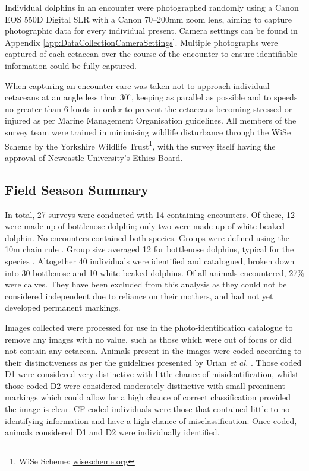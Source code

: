 Individual dolphins in an encounter were photographed randomly using a Canon EOS 550D Digital SLR with a Canon 70–200mm zoom lens, aiming to capture photographic data for every individual present. Camera settings can be found in Appendix \ref{app:DataCollectionCameraSettings}. Multiple photographs were captured of each cetacean over the course of the encounter to ensure identifiable information could be fully captured. 

When capturing an encounter care was taken not to approach individual cetaceans at an angle less than $30^{\circ}$, keeping as parallel as possible and to speeds no greater than 6 knots in order to prevent the cetaceans becoming stressed or injured as per Marine Management Organisation guidelines. All members of the survey team were trained in minimising wildlife disturbance through the WiSe Scheme by the Yorkshire Wildlife Trust\footnote{WiSe Scheme: \href{https://www.wisescheme.org/}{wisescheme.org}}, with the survey itself having the approval of Newcastle University's Ethics Board.

\subsection{Field Season Summary}\label{ch:NDD,sec:dataCollection,sub:summary}

In total, 27 surveys were conducted with 14 containing encounters. Of these, 12 were made up of bottlenose dolphin; only two were made up of white-beaked dolphin. No encounters contained both species. Groups were defined using the 10m chain rule \cite{smolker_sex_1992}. Group size averaged 12 for bottlenose dolphins, typical for the species \cite{shane_ecology_1986}. Altogether 40 individuals were identified and catalogued, broken down into 30 bottlenose and 10 white-beaked dolphins. Of all animals encountered, 27\% were calves. They have been excluded from this analysis as they could not be considered independent due to reliance on their mothers, and had not yet developed permanent markings.

Images collected were processed for use in the photo-identification catalogue to remove any images with no value, such as those which were out of focus or did not contain any cetacean. Animals present in the images were coded according to their distinctiveness as per the guidelines presented by Urian \textit{et al.} \cite{urian_recommendations_2015}. Those coded D1 were considered very distinctive with little chance of misidentification, whilst those coded D2 were considered moderately distinctive with small prominent markings which could allow for a high chance of correct classification provided the image is clear. CF coded individuals were those that contained little to no identifying information and have a high chance of misclassification. Once coded, animals considered D1 and D2 were individually identified.

